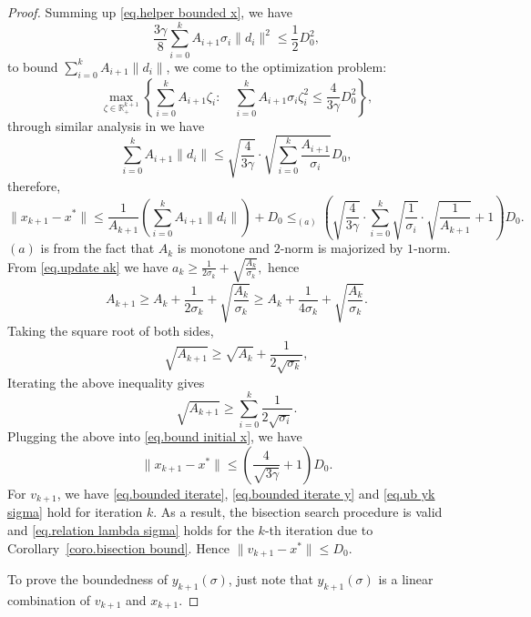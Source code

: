 \documentclass{article}
\begin{document}
\begin{proof}
    Summing up \eqref{eq.helper bounded x}, we have
    \begin{equation*}
        \frac{3\gamma}{8}\sum_{i=0}^k A_{i+1}\sigma_i \|d_i\|^2 \leq \frac{1}{2}D_0^2,
    \end{equation*}
    to bound $\sum_{i=0}^k A_{i+1}\|d_i\|$, we come to the optimization problem:
    \begin{equation*}
        \max _{\zeta \in \mathbb{R}^{k+1}_+}\left\{\sum_{i=0}^{k} A_{i+1}\zeta_i: \quad \sum_{i=0}^{k} A_{i+1} \sigma_i\zeta_i^2 \leq \frac{4}{3\gamma}D_0^2\right\},
    \end{equation*}
    through similar analysis in \citet[Lemma A.2]{monteiro2013accelerated} we have
    \begin{equation*}
        \sum_{i=0}^k A_{i+1}\|d_i\| \leq \sqrt{\frac{4}{3\gamma}}\cdot \sqrt{\sum_{i=0}^k \frac{A_{i+1}}{\sigma_i}} D_0,
    \end{equation*}
    therefore,
    \begin{equation}\label{eq.bound initial x}
        \|x_{k+1}-x^*\|  \leq \frac{1}{A_{k+1}}\left (\sum_{i=0}^k A_{i+1}\|d_i\|\right)+D_0  \leq_{(a)} \left(\sqrt{\frac{4}{3\gamma}}\cdot \sum_{i=0}^k\sqrt{\frac{1}{\sigma_i}}\cdot \sqrt{\frac{1}{A_{k+1}}} +1\right)D_0.
    \end{equation}
    $(a)$ is from the fact that $A_k$ is monotone and $2$-norm is majorized by $1$-norm. From \eqref{eq.update ak} we have
    \(
    a_k \geq \frac{1}{2\sigma_k}+\sqrt{\frac{A_k}{\sigma_k}},
    \)
    hence
    \begin{equation*}
        A_{k+1}\geq A_k+\frac{1}{2\sigma_k}+\sqrt{\frac{A_k}{\sigma_k}}\geq A_k+\frac{1}{4\sigma_k}+\sqrt{\frac{A_k}{\sigma_k}}.
    \end{equation*}
    Taking the square root of both sides,
    \begin{equation*}
        \sqrt{A_{k+1}}\geq \sqrt{A_k}+\frac{1}{2\sqrt{\sigma_k}},
    \end{equation*}
    Iterating the above inequality gives
    \begin{equation*}
        \sqrt{A_{k+1}}\geq \sum_{i=0}^k \frac{1}{2\sqrt{\sigma_i}}.
    \end{equation*}
    Plugging the above into \eqref{eq.bound initial x}, we have
    \begin{equation*}
        \|x_{k+1}-x^*\| \leq \left( \frac{4}{\sqrt{3\gamma}}+1\right) D_0.
    \end{equation*}
    For $v_{k+1}$, we have \eqref{eq.bounded iterate}, \eqref{eq.bounded iterate y} and \eqref{eq.ub yk sigma} hold for iteration $k$. As a result, the bisection search procedure is valid and \eqref{eq.relation lambda sigma} holds for the $k$-th iteration due to Corollary~\ref{coro.bisection bound}. Hence $\|v_{k+1}-x^*\|\leq D_0$.

    To prove the boundedness of $y_{k+1}(\sigma)$, just note that $y_{k+1}(\sigma)$ is a linear combination of $v_{k+1}$ and $x_{k+1}$.
\end{proof}

% 

\clearpage

\tableofcontents

\clearpage
\end{document}
